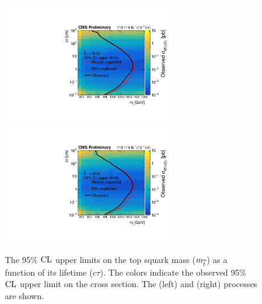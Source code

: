 \begin{figure}
\centering
\includegraphics[width=0.65\textwidth]{figures/results/2DlimitsCombinedStopToLB.pdf}
\includegraphics[width=0.65\textwidth]{figures/results/2DlimitsCombinedStopToLD.pdf}
\caption{The 95\% $\text{CL}$ upper limits on the top squark mass ($m_{\widetilde{t}}$) as a function of its lifetime ($c\tau$). The colors indicate the observed 95\% $\text{CL}$ upper limit on the cross section. The \stoptolb (left) and \stoptold (right) processes are shown.} 
\label{limits_combined}
\end{figure}